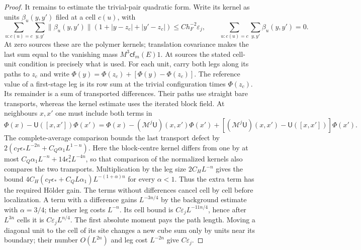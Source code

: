 \documentclass[11pt,letterpaper,reqno]{amsart}
\theoremstyle{definition}
\theoremstyle{remark}
\begin{document}
\begin{proof}
It remains to estimate the trivial-pair quadratic form.  Write
its kernel as units $\beta_u(y,y')$ filed at a cell $c(u)$,
with
\[
 \sum_{u:c(u)=c}\sum_{y,y'}\|\beta_u(y,y')\|
 (1+|y-z_c|+|y'-z_c|)\le Ch_F^{-2}\varepsilon_j,
 \qquad \sum_{u:c(u)=c}\sum_{y,y'}\beta_u(y,y')=0.
\]
At zero sources these are the polymer kernels; translation
covariance makes the last sum equal to the vanishing mass
$M^3\mathsf{cf}_m(E)1$.
At sources the stated cell-unit condition is precisely what
is used.  For each unit, carry both legs along its paths to
$z_c$ and write
$\Phi(y)=\Phi(z_c)+[\Phi(y)-\Phi(z_c)]$.
The reference value of a first-stage leg is its row sum
at the trivial configuration times $\Phi(z_c)$.  Its
remainder is a sum of transported differences.  Their
paths use straight bare transports, whereas the kernel
estimate uses the iterated block field.  At neighbours
$x,x'$ one must include both terms in
\[
 \Phi(x)-\mathsf U([x,x'])\Phi(x')
 =\Phi(x)-(\mathcal M^j\mathsf U)(x,x')\Phi(x')
 +[(\mathcal M^j\mathsf U)(x,x')-\mathsf U([x,x'])]\Phi(x').
\]
The complete-average comparison bounds the last transport
defect by $2(c_T\epsilon_*L^{-2n}+C_Q\alpha_1L^{1-n})$.
Here the block-centre kernel differs from one by at most
$C_Q\alpha_1L^{-n}+14\epsilon_*^2L^{-4n}$, so that
comparison of the normalized kernels also compares the
two transports.  Multiplication by the leg size
$2C_HL^{-n}$ gives the bound
$4C_H(c_T\epsilon_*+C_QL\alpha_1)L^{-(1+\alpha)n}$
for every $\alpha<1$.  Thus the extra term has the
required H\"older gain.  The terms without differences
cancel cell by cell before localization.  A term with a difference gains
$L^{-3n/4}$ by the background estimate with $\alpha=3/4$;
the other leg costs $L^{-n}$.  Its cell bound is
$C\varepsilon_jL^{-11n/4}$, hence after $L^{3n}$ cells it
is $C\varepsilon_jL^{n/4}$.  The first absolute moment
pays the path length.  Moving a diagonal unit to the cell of
its site changes a new cube sum only by units near its
boundary; their number $O(L^{2n})$ and leg cost $L^{-2n}$
give $C\varepsilon_j$.


\end{proof}
\end{document}
